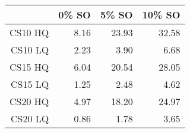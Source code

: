 \begin{table}[ht]
\begin{center}
\begin{tabular}{rrrr}
  \hline
 & 0\% SO & 5\% SO & 10\% SO \\
  \hline
CS10 HQ & 8.16 & 23.93 & 32.58 \\
  CS10 LQ & 2.23 & 3.90 & 6.68 \\
  CS15 HQ & 6.04 & 20.54 & 28.05 \\
  CS15 LQ & 1.25 & 2.48 & 4.62 \\
  CS20 HQ & 4.97 & 18.20 & 24.97 \\
  CS20 LQ & 0.86 & 1.78 & 3.65 \\
   \hline
\end{tabular}
\end{center}
\end{table}
